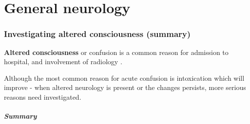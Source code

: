 \chapter{General neurology}

\subsection{Investigating altered consciousness (summary)}

\textbf{Altered consciousness} or confusion is a common reason for admission to hospital, and involvement of radiology .

Although the most common reason for acute confusion is intoxication which will improve - when altered neurology is present or the changes persists, more serious reasons need investigated.

\paragraph{Summary}

